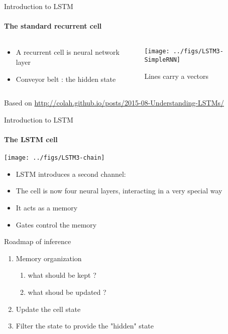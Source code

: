 

\begin{frame}{Introduction to LSTM}
\framesubtitle{The standard recurrent cell}
\begin{columns}
  \begin{column}{0.35\textwidth}
    \begin{itemize}
    \item A recurrent cell is neural network layer
    \item Conveyor belt : the hidden state
    \end{itemize}
  \end{column}
  \begin{column}{0.6\textwidth}
    \begin{center}
      \texttt{[image: ../figs/LSTM3-SimpleRNN]}
    \end{center}
    Lines carry a vectors
  \end{column}
\end{columns}
\begin{flushright}\vfill
  Based on
  \url{http://colah.github.io/posts/2015-08-Understanding-LSTMs/}
\end{flushright}
\end{frame}
\begin{frame}{Introduction to LSTM}
\framesubtitle{The LSTM cell}
    \begin{center}
      \texttt{[image: ../figs/LSTM3-chain]}
    \end{center}
    \begin{itemize}
    \item LSTM introduces a second channel:\\ 
    \item The cell is now four neural layers, interacting in a very special way
    \item It acts as a memory
    \item Gates control the memory
    \end{itemize}
\end{frame}


\begin{frame}{Roadmap of inference}
  \begin{enumerate}
  \item Memory organization
    \begin{enumerate}
    \item what should be kept ? 
    \item what shoud be updated ? 
    \end{enumerate}
  \item Update the cell state
  \item Filter the state to provide the "hidden" state 
  \end{enumerate}
\end{frame}

